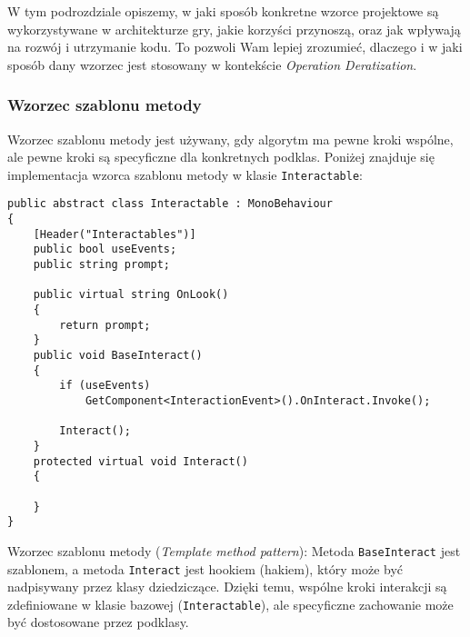 W tym podrozdziale opiszemy, w jaki sposób konkretne wzorce projektowe są wykorzystywane w architekturze gry, jakie korzyści przynoszą, oraz jak wpływają na rozwój i utrzymanie kodu. To pozwoli Wam lepiej zrozumieć, dlaczego i w jaki sposób dany wzorzec jest stosowany w kontekście \textit{Operation Deratization}.

\subsubsection{Wzorzec szablonu metody}\label{subsubsec:tempMeth}
Wzorzec szablonu metody jest używany, gdy algorytm ma pewne kroki wspólne, ale pewne kroki są specyficzne dla konkretnych podklas. Poniżej znajduje się implementacja wzorca szablonu metody w klasie \texttt{Interactable}:
\begin{codebox}
\begin{lstlisting}[language={[Sharp]C}, label={listing:Interactable.cs}]
public abstract class Interactable : MonoBehaviour
{
    [Header("Interactables")]
    public bool useEvents;
    public string prompt;

    public virtual string OnLook()
    {
        return prompt;
    }
    public void BaseInteract()
    {
        if (useEvents)
            GetComponent<InteractionEvent>().OnInteract.Invoke();

        Interact();
    }
    protected virtual void Interact()
    {

    }
}
\end{lstlisting}
\end{codebox}
Wzorzec szablonu metody (\textit{Template method pattern}): Metoda \texttt{BaseInteract} jest szablonem, a metoda \texttt{Interact} jest hookiem (hakiem), który może być nadpisywany przez klasy dziedziczące. Dzięki temu, wspólne kroki interakcji są zdefiniowane w klasie bazowej (\texttt{Interactable}), ale specyficzne zachowanie może być dostosowane przez podklasy.

